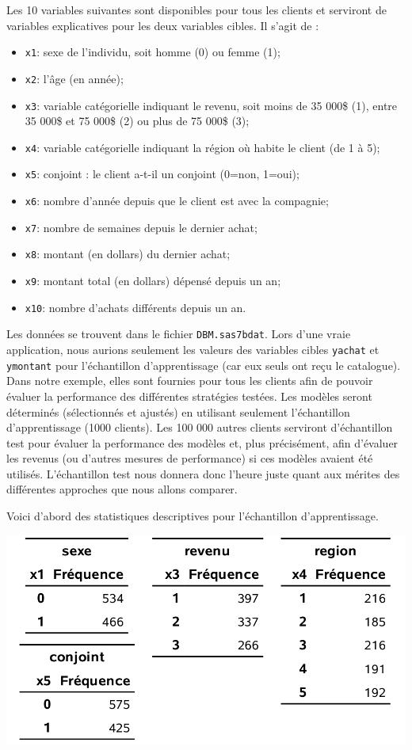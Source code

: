 \documentclass[
  11pt,
  letterpaper,
]{book}
\providecommand{\tightlist}{%
  \setlength{\itemsep}{0pt}\setlength{\parskip}{0pt}}
\theoremstyle{definition}
\theoremstyle{definition}
\theoremstyle{definition}
\theoremstyle{remark}
\begin{document}
Les 10 variables suivantes sont disponibles pour tous les clients et serviront de variables explicatives pour les deux variables cibles. Il s'agit de :

\begin{itemize}
\tightlist
\item
  \texttt{x1}: sexe de l'individu, soit homme (0) ou femme (1);
\item
  \texttt{x2}: l'âge (en année);
\item
  \texttt{x3}: variable catégorielle indiquant le revenu, soit moins de 35 000\$ (1), entre 35 000\$ et 75 000\$ (2) ou plus de 75 000\$ (3);
\item
  \texttt{x4}: variable catégorielle indiquant la région où habite le client (de 1 à 5);
\item
  \texttt{x5}: conjoint : le client a-t-il un conjoint (0=non, 1=oui);
\item
  \texttt{x6}: nombre d'année depuis que le client est avec la compagnie;
\item
  \texttt{x7}: nombre de semaines depuis le dernier achat;
\item
  \texttt{x8}: montant (en dollars) du dernier achat;
\item
  \texttt{x9}: montant total (en dollars) dépensé depuis un an;
\item
  \texttt{x10}: nombre d'achats différents depuis un an.
\end{itemize}

Les données se trouvent dans le fichier \texttt{DBM.sas7bdat}. Lors d'une vraie application, nous aurions seulement les valeurs des variables cibles \texttt{yachat} et \texttt{ymontant} pour l'échantillon d'apprentissage (car eux seuls ont reçu le catalogue). Dans notre exemple, elles sont fournies pour tous les clients afin de pouvoir évaluer la performance des différentes stratégies testées. Les modèles seront déterminés (sélectionnés et ajustés) en utilisant seulement l'échantillon d'apprentissage (1000 clients). Les 100 000 autres clients serviront d'échantillon test pour évaluer la performance des modèles et, plus précisément, afin d'évaluer les revenus (ou d'autres mesures de performance) si ces modèles avaient été utilisés. L'échantillon test nous donnera donc l'heure juste quant aux mérites des différentes approches que nous allons comparer.

Voici d'abord des statistiques descriptives pour l'échantillon d'apprentissage.

\begin{center}\includegraphics[width=0.6\linewidth]{figures/02-select-e3} \end{center}
\end{document}
